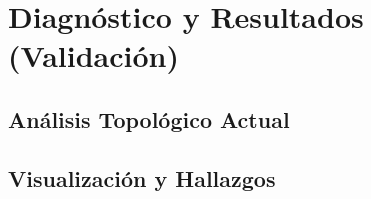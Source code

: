 
\section{Diagnóstico y Resultados (Validación)}
\label{section:diagnostico-resultados}
\lipsum[11]

\subsection{Análisis Topológico Actual}
\label{subsection:analisis-topologico-actual}
\lipsum[12]

\subsection{Visualización y Hallazgos}
\label{subsection:visualizacion-hallazgos}
\lipsum[13]